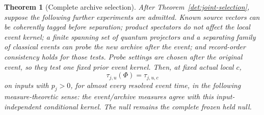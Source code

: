 \documentclass[11pt,oneside,openany]{book}
\newtheorem{theorem}{Theorem}[chapter]
\theoremstyle{definition}
\theoremstyle{remark}\newtheorem{remark}[theorem]{Remark}
\begin{document}
\begin{theorem}[Complete archive selection]\label{det:archive-selection}
After Theorem~\ref{det:joint-selection}, suppose the following further
experiments are admitted. Known source vectors can be coherently tagged
before separation; product spectators do not affect the local event
kernel; a finite spanning set of quantum projectors and a separating
family of classical events can probe the new archive after the event;
and record-order consistency holds for those tests. Probe settings are
chosen after the original event, so they test one fixed prior event
kernel. Then, at fixed actual local $c$,
\[
 \tau_{j,u}(\Phi)=\tau_{j,u,c}
\]
on inputs with $p_j>0$, for almost every resolved event time, in the
following measure-theoretic sense: the event/archive measures agree
with this input-independent conditional kernel. The null remains the
complete frozen held null.
\end{theorem}
\end{document}

